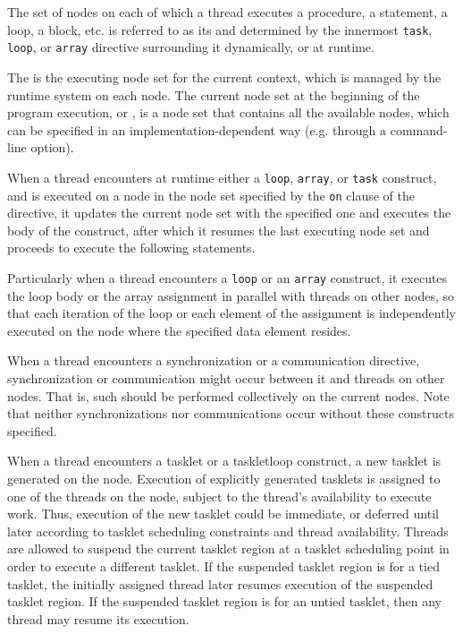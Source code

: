 The set of nodes on each of which a thread executes a procedure, a
statement, a loop, a block, etc. is referred to as its {\it
{}} and determined by the innermost {\tt task},
{\tt loop}, or {\tt array} directive surrounding it dynamically, or at
runtime.

The {\it {}} is the executing node set
for the current context, which is managed by the {\XMP} runtime system
on each node. The current node set at the beginning of the program
execution, or {\it {}}, is a node set that contains
all the available nodes, which can be specified in an
implementation-dependent way (e.g. through a command-line option).

When a thread encounters at runtime either a {\tt loop}, {\tt array}, or
{\tt task} construct, and is executed on a node in the node set
specified by the {\tt on} clause of the directive, it updates the
current node set with the specified one and executes the body of the
construct, after which it resumes the last executing node set and
proceeds to execute the following statements.

Particularly when a thread encounters a {\tt loop} or an {\tt array}
construct, it executes the loop body or the array assignment in parallel
with threads on other nodes, so that each iteration of the loop or each
element of the assignment is independently executed on the node where
the specified data element resides.

When a thread encounters a synchronization or a communication
directive, synchronization or communication might occur between it and
threads on other nodes. That is, such {\it {}}
should be performed collectively on the current nodes. Note that neither
synchronizations nor communications occur without these constructs
specified.

When a thread encounters a tasklet or a taskletloop construct, a new
tasklet is generated on the node. Execution of explicitly generated
tasklets is assigned to one of the threads on the node, subject to the
thread’s availability to execute work. Thus, execution of the new
tasklet could be immediate, or deferred until later according to
tasklet scheduling constraints and thread availability. Threads are 
allowed to suspend the current tasklet region at a tasklet scheduling
point in order to execute a different tasklet. If the suspended
tasklet region is for a tied tasklet, the initially assigned thread
later resumes execution of the suspended tasklet region. If the
suspended tasklet region is for an untied tasklet, then any thread may
resume its execution.


